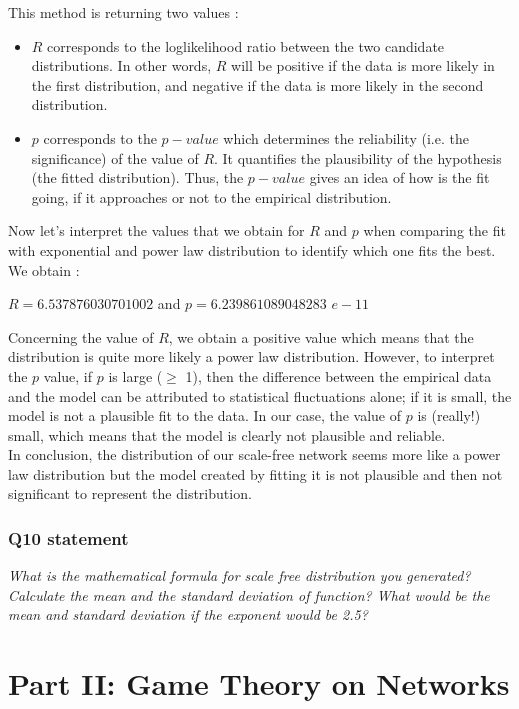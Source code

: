\documentclass{article}
\begin{document}
This method is returning two values : 
\begin{itemize}
\item $R$ corresponds to the loglikelihood ratio between the two candidate distributions. In other words, $R$ will be positive if the data is more likely in the first distribution, and negative if the data is more likely in the second distribution. 
\item $p$ corresponds to the $p-value$ which determines the reliability (i.e. the significance) of the value of $R$. It quantifies the plausibility of the hypothesis (the fitted distribution). Thus, the $p-value$ gives an idea of how is the fit going, if it approaches or not to the empirical distribution.   
\end{itemize}

\noindent
Now let's interpret the values that we obtain for $R$ and $p$ when comparing the fit with exponential and power law distribution to identify which one fits the best. We obtain : 
\begin{center}
$ R = 6.537876030701002 $ and $p = 6.239861089048283$ $e-11$
\end{center}
Concerning the value of $R$, we obtain a positive value which means that the distribution is quite more likely a power law distribution. However, to interpret the $p$ value, if $p$ is large ($\ge$ 1), then the difference between the empirical data and the model can be attributed to statistical fluctuations alone; if it is small, the model is not a plausible fit to the data. In our case, the value of $p$ is (really!) small, which means that the model is clearly not plausible and reliable. \\

\noindent
In conclusion, the distribution of our scale-free network seems more like a power law distribution but the model created by fitting it is not plausible and then not significant to represent the distribution.     


\subsubsection{Q10 statement}
\textit{What is the mathematical formula for scale free distribution you generated? Calculate the mean and the standard deviation of function? What would be the mean and standard deviation if the exponent would be 2.5?}

\newpage 
\section{Part II: Game Theory on Networks}
\end{document}
